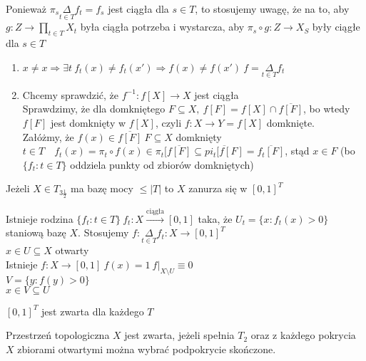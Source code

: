 \begin{dd} 
    Ponieważ $\pi_s \underset{t \in T}{\Delta}f_t = f_s$ jest ciągła dla $s \in T$, to 
    stosujemy uwagę, że na to, aby $g: Z \to \prod\limits_{t \in T} X_t$ była ciągła 
    potrzeba i wystarcza, aby $\pi_s \circ g : Z \to X_S$ były ciągłe dla $s \in T$ 
    \begin{enumerate}[(1)] 
        \item $x \neq x \Rightarrow \exists t \ f_t (x) \neq f_t (x') \Rightarrow 
            f(x) \neq f(x') \ f = \underset{t \in T}{\Delta} f_t$
        \item Chcemy sprawdzić, że $f^{-1}: f[X] \to X$ jest ciągła \\ 
            Sprawdzimy, że dla domkniętego $F \subseteq X, \ f[F] = f[X] \cap 
    \overline{f[F]}$, bo wtedy $f[F]$ jest domknięty w $f[X]$, czyli $f: X \to Y = f[X]$
    domknięte. \\ 
            Załóżmy, że $f(x) \in \overline{f[F]} \ F \subseteq X$ domknięty \\ 
            $t \in T \quad f_t (x) = \pi_t \circ f(x) \in \pi_t [ \overline{f[F]} 
            \subseteq \overline{pi_t[f[F]} = \overline{f_t[F]}$, stąd $x \in F$
            (bo $\{ f_t : t \in T\}$ oddziela punkty od zbiorów domkniętych)
    \end{enumerate} 
\end{dd} 
\begin{tw} 
    Jeżeli $X \in T_{3 \frac{1}{2}}$ ma bazę mocy $\le |T|$ to $X$ zanurza się w $[0,1]^T$
\end{tw} 
\begin{dd} 
    Istnieje rodzina $\{f_t: t \in T\} \ f_t : X \xrightarrow{\text{ciągła}} [0,1]$ taka, 
    że $U_t = \{ x: f_t (x) > 0\}$ staniową bazę $X$. Stosujemy $f: \underset{t \in T}
    {\Delta} f_t: X \to [0,1]^T$ \\ 
    $x \in U \subseteq X$ otwarty \\ 
    Istnieje $f: X \to [0,1] \ f(x) = 1 \ f|_{X \setminus U} \equiv 0$ \\ 
    $V = \{y : f(y) > 0\}$ \\ 
    $x \in V \subseteq U$ 
\end{dd} 
\begin{tw} 
    $[0,1]^T$ jest zwarta dla każdego $T$
\end{tw} 
\begin{df} 
    Przestrzeń topologiczna $X$ jest zwarta, jeżeli spełnia $T_2$ oraz z każdego pokrycia 
    $X$ zbiorami otwartymi można wybrać podpokrycie skończone.
\end{df} 
